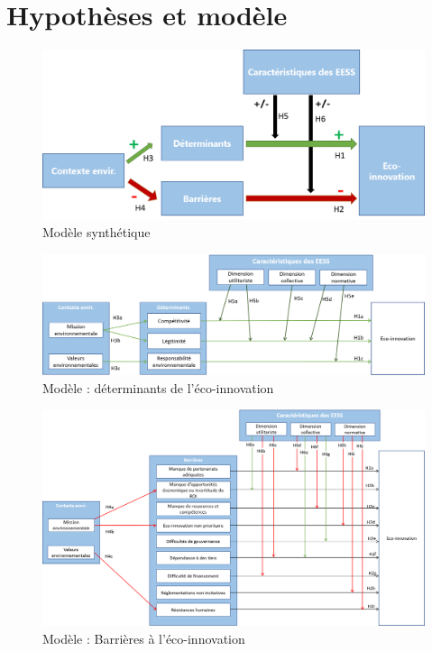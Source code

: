\section{Hypothèses et modèle}

\begin{figure}[h]
    \caption{Modèle synthétique}
    \label{fig:modelsynth}
    \includegraphics[width=\linewidth]{fig/Modele/model1.png}
\end{figure}

\begin{figure}[h]
    \caption{Modèle : déterminants de l'éco-innovation}
    \label{fig:modeldet}
    \includegraphics[width=\linewidth]{fig/Modele/model2.png}
\end{figure}

\begin{figure}[h]
    \caption{Modèle : Barrières à l'éco-innovation}
    \label{fig:modelbar}
    \includegraphics[width=\linewidth]{fig/Modele/model3.png}
\end{figure}

